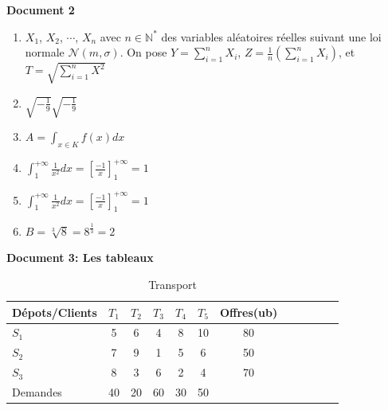 \documentclass[10pt,a4paper]{article}
\begin{document}
\newpage

\large\textbf{Document 2}

\begin{enumerate}
\item $X_1$, $X_2$, $\cdots$, $X_n$ avec $n \in \mathbb{N}^{*}$ des variables aléatoires réelles suivant une loi normale $\mathcal{N}(m,\sigma)$. On pose $Y=\sum_{i=1}^nX_i$, 
 $Z=\frac{1}{n}\left(\sum^n_{i=1}X_i\right)$, et $T=\sqrt{\sum^n_{i=1}X^2}$ \\
\item $\sqrt{-\frac{1}{9}}\sqrt{-\frac{1}{9}}$\\

\item $A=\int_{x \in K}{f(x)dx}$\\

\item $\int^{+\infty}_1{\frac{1}{x^2}dx}= \left[\frac{-1}{x}\right]^{+\infty}_1=1$

\item $\int^{+\infty}_1{\frac{1}{x^2}dx}=\left[\frac{-1}{x}\right]^{+\infty}_1=1$

\item $B=\sqrt[3]{8}=8^{\frac{1}{3}}=2$

\end{enumerate}

\newpage

\large\textbf{Document 3: Les tableaux}
\vspace{1cm}
\begin{table}[h!]
\centering
\begin{tabular}{|p{2.2cm}|c|c|c|c|c|c|ccccc}\hline
Dépots/Clients&$T_1$&$T_2$&$T_3$&$T_4$&$T_5$&Offres(ub)\\\hline
$S_1$&5&6&4&8&10&80\\\hline
$S_2$&7&9&1&5&6&50\\\hline
$S_3$&8&3&6&2&4&70\\\hline
Demandes&40&20&60&30&50&\\\hline

\end{tabular}
\caption{Transport}
\end{table}
\end{document}

